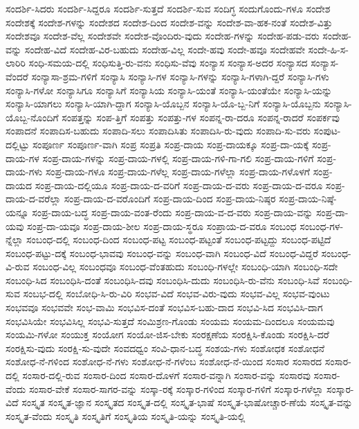{ಸಂದರ್ಶಿ-ಸಿದರು
ಸಂದರ್ಶಿ-ಸಿದ್ದರೂ
ಸಂದರ್ಶಿ-ಸುತ್ತದೆ
ಸಂದರ್ಶಿ-ಸುವ
ಸಂದಿಗ್ಧ
ಸಂದುಗೊಂದು-ಗಳೂ
ಸಂದೇಶ
ಸಂದೇಶಕ್ಕೆ
ಸಂದೇಶ-ಗಳನ್ನು
ಸಂದೇಶದ
ಸಂದೇಶ-ದಿಂದ
ಸಂದೇಶ-ವನ್ನು
ಸಂದೇಶ-ವಾ-ಹಕ-ನಂತೆ
ಸಂದೇಶ-ವಿತ್ತು
ಸಂದೇಶವೂ
ಸಂದೇಶ-ವೆಲ್ಲ
ಸಂದೇಶವೇ
ಸಂದೇಶ-ವೊಂದಿರು-ವುದು
ಸಂದೇಹ-ಗಳನ್ನು
ಸಂದೇಹ-ಪಡು-ವರು
ಸಂದೇಹ-ವನ್ನು
ಸಂದೇಹ-ವಿದೆ
ಸಂದೇಹ-ವಿರ-ಬಹುದು
ಸಂದೇಹ-ವಿಲ್ಲ
ಸಂದೇ-ಹವು
ಸಂದೇ-ಹವೂ
ಸಂದೇಹವೇ
ಸಂದೇ-ಹಿ-ಸ-ಲಾರಿರಿ
ಸಂಧಿ-ಸಮಯ-ದಲ್ಲಿ
ಸಂಧಿಸುತ್ತಿ-ರು-ವನು
ಸಂಧಿಸು-ವೆವು
ಸಂನ್ಯಾಸ
ಸಂನ್ಯಾಸ-ಅದರ
ಸಂನ್ಯಾಸದ
ಸಂನ್ಯಾಸ-ವೆಂದರೆ
ಸಂನ್ಯಾಸಾ-ಶ್ರಮ-ಗಳಿಗೆ
ಸಂನ್ಯಾಸಿ
ಸಂನ್ಯಾಸಿ-ಗಳ
ಸಂನ್ಯಾಸಿ-ಗಳನ್ನು
ಸಂನ್ಯಾಸಿ-ಗಳಾಗಿ-ದ್ದರೆ
ಸಂನ್ಯಾಸಿ-ಗಳು
ಸಂನ್ಯಾಸಿ-ಗಳೋ
ಸಂನ್ಯಾಸಿಗೂ
ಸಂನ್ಯಾಸಿಗೆ
ಸಂನ್ಯಾಸಿಯ
ಸಂನ್ಯಾಸಿ-ಯಂತೆ
ಸಂನ್ಯಾಸಿ-ಯಂತೆಯೇ
ಸಂನ್ಯಾಸಿ-ಯನ್ನು
ಸಂನ್ಯಾಸಿ-ಯಾಗಲು
ಸಂನ್ಯಾಸಿ-ಯಾಗಿ-ದ್ದಾಗ
ಸಂನ್ಯಾಸಿ-ಯೊಬ್ಬನ
ಸಂನ್ಯಾಸಿ-ಯೊ-ಬ್ಬ-ನಿಗೆ
ಸಂನ್ಯಾಸಿ-ಯೊಬ್ಬನು
ಸಂನ್ಯಾಸಿ-ಯೊಬ್ಬ-ನೊಂದಿಗೆ
ಸಂಪತ್ತನ್ನು
ಸಂಪ-ತ್ತಿಗೆ
ಸಂಪತ್ತು
ಸಂಪತ್ತು-ಗಳ
ಸಂಪನ್ನ-ರಾ-ದರೂ
ಸಂಪನ್ನ-ರಾದರೆ
ಸಂಪರ್ಕವು
ಸಂಪಾದನೆ
ಸಂಪಾದಿಸ-ಬಹುದು
ಸಂಪಾದಿ-ಸಲು
ಸಂಪಾದಿಸಿತು
ಸಂಪಾದಿಸಿ-ರು-ವುದು
ಸಂಪಾದಿ-ಸು-ವರು
ಸಂಪುಟ-ದಲ್ಲಿಟ್ಟು
ಸಂಪೂರ್ಣ
ಸಂಪೂರ್ಣ-ವಾಗಿ
ಸಂಪ್ರ
ಸಂಪ್ರತಿ
ಸಂಪ್ರ-ದಾಯ
ಸಂಪ್ರ-ದಾಯಕ್ಕೂ
ಸಂಪ್ರ-ದಾ-ಯಕ್ಕೆ
ಸಂಪ್ರ-ದಾಯ-ಗಳ
ಸಂಪ್ರ-ದಾಯ-ಗಳನ್ನು
ಸಂಪ್ರ-ದಾಯ-ಗಳಲ್ಲಿ
ಸಂಪ್ರ-ದಾಯ-ಗಳಿ-ಗಾ-ಗಲಿ
ಸಂಪ್ರ-ದಾಯ-ಗಳಿಗೆ
ಸಂಪ್ರ-ದಾಯ-ಗಳು
ಸಂಪ್ರ-ದಾಯ-ಗಳೂ
ಸಂಪ್ರ-ದಾಯ-ಗಳೆಲ್ಲ
ಸಂಪ್ರ-ದಾಯ-ಗಳೆಲ್ಲಾ
ಸಂಪ್ರ-ದಾಯ-ಗಳೊಳಗೆ
ಸಂಪ್ರ-ದಾಯದ
ಸಂಪ್ರ-ದಾಯ-ದಲ್ಲಿಯೂ
ಸಂಪ್ರ-ದಾಯ-ದ-ವರಿಗೆ
ಸಂಪ್ರ-ದಾಯ-ದ-ವರು
ಸಂಪ್ರ-ದಾಯ-ದ-ವರೂ
ಸಂಪ್ರ-ದಾಯ-ದ-ವರೆಲ್ಲಾ
ಸಂಪ್ರ-ದಾಯ-ದ-ವರೊಂದಿಗೆ
ಸಂಪ್ರ-ದಾಯ-ದಿಂದ
ಸಂಪ್ರ-ದಾಯ-ನಿಷ್ಠರ
ಸಂಪ್ರ-ದಾಯ-ನಿಷ್ಠೆ-ಯನ್ನೂ
ಸಂಪ್ರ-ದಾಯ-ಬದ್ಧ
ಸಂಪ್ರ-ದಾಯ-ವಂತ-ರೆಂದು
ಸಂಪ್ರ-ದಾಯ-ವ-ದ-ವರು
ಸಂಪ್ರ-ದಾಯ-ವನ್ನು
ಸಂಪ್ರ-ದಾ-ಯವು
ಸಂಪ್ರ-ದಾ-ಯವೂ
ಸಂಪ್ರ-ದಾಯ-ಶೀಲ
ಸಂಪ್ರ-ದಾಯ-ಸ್ಥರೂ
ಸಂಪ್ರಾಯ-ದ-ವರೂ
ಸಂಬಂಧ
ಸಂಬಂಧ-ಗಳ-ನ್ನೆಲ್ಲಾ
ಸಂಬಂಧ-ದಲ್ಲಿ
ಸಂಬಂಧ-ದಿಂದ
ಸಂಬಂಧ-ಪಟ್ಟ
ಸಂಬಂಧ-ಪಟ್ಟಂತೆ
ಸಂಬಂಧ-ಪಟ್ಟದ್ದು
ಸಂಬಂಧ-ಪಟ್ಟಿದೆ
ಸಂಬಂಧ-ಪಟ್ಟು-ದಕ್ಕೆ
ಸಂಬಂಧ-ಭಾವವು
ಸಂಬಂಧ-ವನ್ನು
ಸಂಬಂಧ-ವಾಗಿ
ಸಂಬಂಧ-ವಿದೆ
ಸಂಬಂಧ-ವಿದ್ದರೆ
ಸಂಬಂಧ-ವಿ-ರುವ
ಸಂಬಂಧ-ವಿಲ್ಲ
ಸಂಬಂಧವೂ
ಸಂಬಂಧ-ವೆಂತಹುದು
ಸಂಬಂಧಿ-ಗಳಲ್ಲೇ
ಸಂಬಂಧಿ-ಯಾಗಿ
ಸಂಬಂಧಿ-ಸದೇ
ಸಂಬಂಧಿ-ಸಿದ
ಸಂಬಂಧಿಸಿ-ದಂತೆ
ಸಂಬಂಧಿಸಿ-ದವು
ಸಂಬಂಧಿಸಿ-ದುದು
ಸಂಬಂಧಿಸಿ-ರು-ವೆನು
ಸಂಬಂಧಿ-ಸಿವೆ
ಸಂಬಂಧಿ-ಸುವ
ಸಂಬಭ-ದಲ್ಲಿ
ಸಂಬೋಧಿ-ಸಿ-ರು-ವಿರಿ
ಸಂಭವ-ವಿದೆ
ಸಂಭವ-ವಿರು-ವುದು
ಸಂಭವ-ವಿಲ್ಲ
ಸಂಭವ-ವುಂಟು
ಸಂಭವವೂ
ಸಂಭವವೇ
ಸಂಭ-ವಾಮಿ
ಸಂಭವಿಸ-ದಂತೆ
ಸಂಭವಿಸ-ಬಹು-ದಾದ
ಸಂಭವಿ-ಸಿದ
ಸಂಭವಿಸಿ-ದಾಗ
ಸಂಭವಿಸಿಯೇ
ಸಂಭವಿಸಿಲ್ಲ
ಸಂಭವಿ-ಸುತ್ತದೆ
ಸಂಮಿಶ್ರಣ-ಗೊಂಡು
ಸಂಯಮ
ಸಂಯಮ-ದಿಂದಲೂ
ಸಂಯಮವು
ಸಂಯಮಿ-ಗಳೋ
ಸಂಯುಕ್ತ
ಸಂಯೋಗ
ಸಂಯೋ-ಜಿಸ-ಬೇಕು
ಸಂರಕ್ಷಣೆಯ
ಸಂರಕ್ಷಿಸಿ-ಕೊಂಡು
ಸಂರಕ್ಷಿಸಿ-ದರೆ
ಸಂರಕ್ಷಿಸು-ವುದು
ಸಂರಕ್ಷಿ-ಸು-ವುದೇ
ಸಂವದಧ್ವಂ
ಸಂವಿ-ಧಾನ-ಬದ್ಧ
ಸಂಶಯ-ಗಳು
ಸಂಶೋಧಕ
ಸಂಶೋಧನೆ
ಸಂಶೋಧ-ನೆ-ಗಳಿಂದ
ಸಂಶೋಧ-ನೆ-ಗಳು
ಸಂಶೋಧ-ನೆ-ಗಳೆಂಬ
ಸಂಶೋಧ-ನೆ-ಯಿಂದ
ಸಂಸಾರ
ಸಂಸಾರದ
ಸಂಸಾರ-ದಲ್ಲಿ
ಸಂಸಾರ-ದಲ್ಲಿ-ರುವ
ಸಂಸಾರ-ದಿಂದ
ಸಂಸಾರ-ದೊಳಗೆ
ಸಂಸಾರ-ವನ್ನಾಗಿ
ಸಂಸಾರ-ವನ್ನು
ಸಂಸಾರವು
ಸಂಸಾರ-ವೆಂದು
ಸಂಸಾರ-ವೇಕೆ
ಸಂಸಾರ-ಸಾಗರ-ವನ್ನು
ಸಂಸ್ಕಾ-ರಕ್ಕೆ
ಸಂಸ್ಕಾರ-ಗಳಿಂದ
ಸಂಸ್ಕಾರ-ಗಳಿಗೆ
ಸಂಸ್ಕಾರ-ಗಳೆಲ್ಲಾ
ಸಂಸ್ಕಾರ-ವಿದೆ
ಸಂಸ್ಕೃತ
ಸಂಸ್ಕೃತ-ಜ್ಞಾನ
ಸಂಸ್ಕೃತದ
ಸಂಸ್ಕೃತ-ದಲ್ಲಿ
ಸಂಸ್ಕೃತ-ಭಾಷೆ
ಸಂಸ್ಕೃತ-ಭಾಷೋಚ್ಚಾರ-ಣೆಯೆ
ಸಂಸ್ಕೃತ-ವನ್ನು
ಸಂಸ್ಕೃತ-ವೆಂದು
ಸಂಸ್ಕೃತಿ
ಸಂಸ್ಕೃತಿಗೆ
ಸಂಸ್ಕೃತಿಯ
ಸಂಸ್ಕೃತಿ-ಯನ್ನು
ಸಂಸ್ಕೃತಿ-ಯಲ್ಲಿ
}

